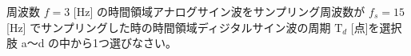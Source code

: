 周波数 $f = 3$ [Hz] の時間領域アナログサイン波をサンプリング周波数が $f_s = 15$ [Hz] でサンプリングした時の時間領域ディジタルサイン波の周期 $\textrm{T}_d$ [点]を選択肢 a〜d の中から1つ選びなさい。
